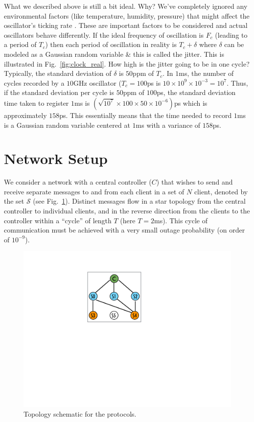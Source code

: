\documentclass[10pt, journal, letter, onecolumn]{IEEEtran}
\begin{document}
What we described above is still a bit ideal. Why? We've completely ignored any environmental factors (like temperature, humidity, pressure) that might affect the oscillator's ticking rate \cite{frerking2012crystal}. These are important factors to be considered and actual oscillators behave differently. If the ideal frequency of oscillation is $F_c$ (leading to a period of $T_c$) then each period of oscillation in reality is $T_c + \delta$ where $\delta$ can be modeled as a Gaussian random variable \& this is called the jitter. This is illustrated in Fig.~\ref{fig:clock_real}. How high is the jitter going to be in one cycle? Typically, the standard deviation of $\delta$ is $50$ppm of $T_c$. In $1$ms, the number of cycles recorded by a $10$GHz oscillator ($T_c = 100$ps is $10 \times 10^{9} \times 10^{-3} = 10^{7}$. Thus, if the standard deviation per cycle is $50$ppm of $100$ps, the standard deviation time taken to register $1$ms is $\left(\sqrt{10^7} \times 100 \times 50 \times 10^{-6}\right)$ps which is approximately $158$ps. This essentially means that the time needed to record $1$ms is a Gaussian random variable centered at $1$ms with a variance of $158$ps.

\section{Network Setup}
\label{sec:setup}

We consider a network with a central controller ($C$) that wishes to send and receive separate messages to and from each client in a set of $N$ client, denoted by the set $\mathcal{S}$ (see Fig.~\ref{fig:setup}). Distinct messages flow in a star topology from the central controller to individual clients, and in the reverse direction from the clients to the controller within a ``cycle'' of length $T$ (here $T = 2$ms). This cycle of communication must be achieved with a very small outage probability (on order of $10^{-9}$).

\begin{figure}
  \begin{center}
    \includegraphics[scale = 0.5]{figures/bubbles_3}
  \end{center}
  \caption{Topology schematic for the protocols.}
  \label{fig:setup}
\end{figure}
\end{document}
